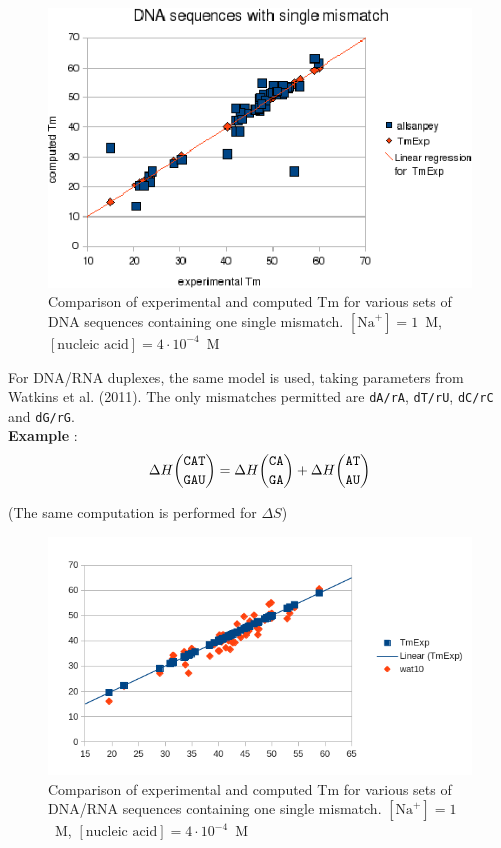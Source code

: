\documentclass{article}
\begin{document}
\begin{figure}[h]
\includegraphics[width=1\linewidth]{images/DNASingleMismatch}
\caption{Comparison of experimental and computed Tm for various sets of
 DNA sequences containing one single mismatch. $[\mbox{Na}^+] = 1$~M, $[\mbox{nucleic acid}] = 4\cdot{}10^{-4}$~M}
\end{figure}

For DNA/RNA duplexes, the same model is used, taking parameters from Watkins
et al. (2011).  The only mismatches permitted are \texttt{dA/rA},
 \texttt{dT/rU}, \texttt{dC/rC} and \texttt{dG/rG}.  \\

\textbf{Example} :
\begin{multline*}
\Delta H {\mbox{\texttt{CAT}} \choose \mbox{\texttt{GAU}}} = 
\Delta H {\mbox{\texttt{CA}} \choose \mbox{\texttt{GA}} } +
\Delta H {\mbox{\texttt{AT}} \choose \mbox{\texttt{AU}} } \\
\end{multline*}

(The same computation is performed for $\Delta S$)\\

\begin{figure}[h]
\includegraphics[width=1\linewidth]{images/DNARNASingleMismatch}
\caption{Comparison of experimental and computed Tm for various sets of
 DNA/RNA sequences containing one single mismatch.  
$[\mbox{Na}^+] = 1$~M, $[\mbox{nucleic acid}] = 4\cdot{}10^{-4}$~M}
\end{figure}
\end{document}
